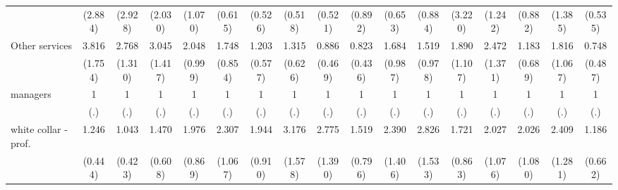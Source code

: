 {\begin{tabular}{l*{16}{c}}
                    &     (2.884)         &     (2.928)         &     (2.030)         &     (1.070)         &     (0.615)         &     (0.526)         &     (0.518)         &     (0.521)         &     (0.892)         &     (0.653)         &     (0.884)         &     (3.220)         &     (1.242)         &     (0.882)         &     (1.385)         &     (0.535)         \\
[1em]
Other services      &       3.816\sym{**} &       2.768\sym{*}  &       3.045\sym{*}  &       2.048         &       1.748         &       1.203         &       1.315         &       0.886         &       0.823         &       1.684         &       1.519         &       1.890         &       2.472         &       1.183         &       1.816         &       0.748         \\
                    &     (1.754)         &     (1.310)         &     (1.417)         &     (0.999)         &     (0.854)         &     (0.577)         &     (0.626)         &     (0.469)         &     (0.436)         &     (0.987)         &     (0.978)         &     (1.107)         &     (1.371)         &     (0.689)         &     (1.067)         &     (0.487)         \\
[1em]
managers            &           1         &           1         &           1         &           1         &           1         &           1         &           1         &           1         &           1         &           1         &           1         &           1         &           1         &           1         &           1         &           1         \\
                    &         (.)         &         (.)         &         (.)         &         (.)         &         (.)         &         (.)         &         (.)         &         (.)         &         (.)         &         (.)         &         (.)         &         (.)         &         (.)         &         (.)         &         (.)         &         (.)         \\
[1em]
white collar - prof.&       1.246         &       1.043         &       1.470         &       1.976         &       2.307         &       1.944         &       3.176\sym{*}  &       2.775\sym{*}  &       1.519         &       2.390         &       2.826         &       1.721         &       2.027         &       2.026         &       2.409         &       1.186         \\
                    &     (0.444)         &     (0.423)         &     (0.608)         &     (0.869)         &     (1.067)         &     (0.910)         &     (1.578)         &     (1.390)         &     (0.796)         &     (1.406)         &     (1.533)         &     (0.863)         &     (1.076)         &     (1.080)         &     (1.281)         &     (0.662)         \\

\end{tabular}}
